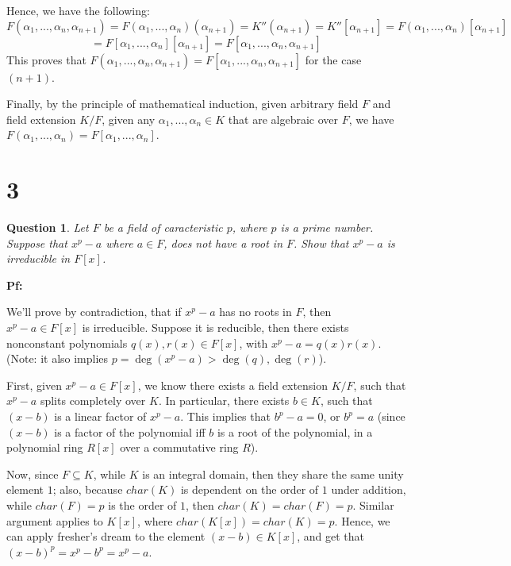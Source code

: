 \documentclass{article}
\newtheorem{question}{Question}
\begin{document}
Hence, we have the following:
$$F(\alpha_1,...,\alpha_n,\alpha_{n+1})=F(\alpha_1,...,\alpha_n)(\alpha_{n+1})=K''(\alpha_{n+1})=K''[\alpha_{n+1}] = F(\alpha_1,...,\alpha_n)[\alpha_{n+1}]$$
$$= F[\alpha_1,...,\alpha_n][\alpha_{n+1}]=F[\alpha_1,...,\alpha_n,\alpha_{n+1}]$$
This proves that $F(\alpha_1,...,\alpha_n,\alpha_{n+1})=F[\alpha_1,...,\alpha_n,\alpha_{n+1}]$ for the case $(n+1)$.

\hfil

Finally, by the principle of mathematical induction, given arbitrary field $F$ and field extension $K/F$, given any $\alpha_1,...,\alpha_n\in K$ that are algebraic over $F$, we have $F(\alpha_1,...,\alpha_n)=F[\alpha_1,...,\alpha_n]$.

\break

\section*{3}
\begin{myBox}[]{}
    \begin{question}
        Let $F$ be a field of caracteristic $p$, where $p$ is a prime number. Suppose that $x^p-a$ where $a\in F$, does not have a root in $F$. 
        Show that $x^p-a$ is irreducible in $F[x]$.
    \end{question}
\end{myBox}

\textbf{Pf:}

We'll prove by contradiction, that if $x^p-a$ has no roots in $F$, then $x^p-a\in F[x]$ is irreducible. Suppose it is reducible, then there exists nonconstant polynomials $q(x),r(x)\in F[x]$, with $x^p-a=q(x)r(x)$.
(Note: it also implies $p=\deg(x^p-a)>\deg(q),\deg(r)$).

\hfil

First, given $x^p-a\in F[x]$, we know there exists a field extension $K/F$, such that $x^p-a$ splits completely over $K$. In particular, there exists $b\in K$, such that $(x-b)$ is a linear factor of $x^p-a$.
This implies that $b^p-a=0$, or $b^p=a$ (since $(x-b)$ is a factor of the polynomial iff $b$ is a root of the polynomial, in a polynomial ring $R[x]$ over a commutative ring $R$).

Now, since $F\subseteq K$, while $K$ is an integral domain, then they share the same unity element $1$; also, because $char(K)$ is dependent on the order of $1$ under addition, while $char(F)=p$ is the order of $1$,
then $char(K)=char(F)=p$. Similar argument applies to $K[x]$, where $char(K[x])=char(K)=p$. Hence, we can apply fresher's dream to the element $(x-b)\in K[x]$,
and get that $(x-b)^p=x^p-b^p=x^p-a$.
\end{document}
